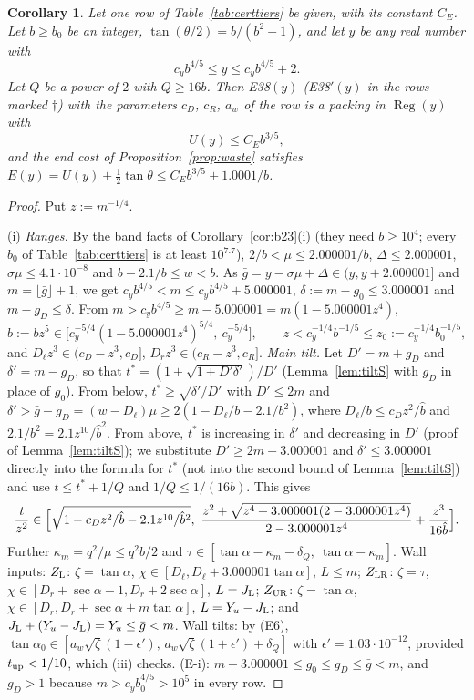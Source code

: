 \documentclass[11pt]{amsart}
\newcommand{\Reg}{\operatorname{Reg}}
\newcommand{\ta}{\tan\alpha}
\newcommand{\se}{\sec\alpha}
\newcommand{\taz}{\tan\alpha_0}
\newtheorem{corollary}[theorem]{Corollary}
\theoremstyle{definition}
\theoremstyle{remark}
\numberwithin{equation}{section}
\begin{document}
\begin{corollary}\label{cor:b35}
Let one row of Table~\ref{tab:certtiers} be given, with its constant $C_E$. Let $b\ge b_0$ be an integer,
$\tan(\theta/2)=b/(b^2-1)$, and let $y$ be any real number with
\[
c_yb^{4/5}\le y\le c_yb^{4/5}+2 .
\]
Let $Q$ be a power of $2$ with $Q\ge16b$. Then E38$(y)$
(E38$'(y)$ in the rows marked $\dagger$)
with the parameters $c_D$, $c_R$, $a_w$ of the row is a packing in $\Reg(y)$ with
\[
U(y)\le C_Eb^{3/5},
\]
and the end cost of Proposition~\ref{prop:waste} satisfies $E(y)=U(y)+\frac12\tan\theta\le C_Eb^{3/5}+1.0001/b$.
\end{corollary}

\begin{proof}
Put $z:=m^{-1/4}$.

(i) \emph{Ranges.} By the band facts of Corollary~\ref{cor:b23}(i) (they need $b\ge10^4$; every $b_0$ of
Table~\ref{tab:certtiers} is at least $10^{7.7}$), $2/b<\mu\le2.000001/b$, $\Delta\le2.000001$,
$\sigma\mu\le4.1\cdot10^{-8}$ and $b-2.1/b\le w<b$. As $\bar g=y-\sigma\mu+\Delta\in(y,y+2.000001]$ and
$m=\lfloor\bar g\rfloor+1$, we get $c_yb^{4/5}<m\le c_yb^{4/5}+5.000001$, $\delta:=m-g_0\le3.000001$ and
$m-g_D\le\delta$. From $m>c_yb^{4/5}\ge m-5.000001=m(1-5.000001z^4)$,
\[
\hat b:=bz^5\in\bigl[c_y^{-5/4}(1-5.000001z^4)^{5/4},\ c_y^{-5/4}\bigr],\qquad
z<c_y^{-1/4}b^{-1/5}\le z_0:=c_y^{-1/4}b_0^{-1/5},
\]
and $D_\ell z^3\in(c_D-z^3,c_D]$, $D_rz^3\in(c_R-z^3,c_R]$. \emph{Main tilt.} Let $D'=m+g_D$ and $\delta'=m-g_D$, so that
$t^*=(1+\sqrt{1+D'\delta'})/D'$ (Lemma~\ref{lem:tiltS} with $g_D$ in place of $g_0$). From below,
$t^*\ge\sqrt{\delta'/D'}$ with $D'\le2m$ and $\delta'>\bar g-g_D=(w-D_\ell)\mu\ge2(1-D_\ell/b-2.1/b^2)$, where
$D_\ell/b\le c_Dz^2/\hat b$ and $2.1/b^2=2.1z^{10}/\hat b^2$. From above, $t^*$ is increasing in $\delta'$ and decreasing
in $D'$ (proof of Lemma~\ref{lem:tiltS}); we substitute $D'\ge2m-3.000001$ and $\delta'\le3.000001$ directly into the
formula for $t^*$ (not into the second bound of Lemma~\ref{lem:tiltS}) and use $t\le t^*+1/Q$ and $1/Q\le1/(16b)$. This
gives
\[
\frac t{z^2}\in\Bigl[\sqrt{1-c_Dz^2/\hat b-2.1z^{10}/\hat b^2},\ \frac{z^2+\sqrt{z^4+3.000001(2-3.000001z^4)}}{2-3.000001z^4}
+\frac{z^3}{16\hat b}\Bigr].
\]
Further $\kappa_m=q^2/\mu\le q^2b/2$ and $\tau\in[\ta-\kappa_m-\delta_Q,\ \ta-\kappa_m]$. Wall inputs: $Z_{\rm L}$:
$\zeta=\ta$, $\chi\in[D_\ell,D_\ell+3.000001\ta]$, $L\le m$; $Z_{\rm LR}$: $\zeta=\tau$, $\chi\in[D_r+\se-1,D_r+2\se]$,
$L=J_{\rm L}$; $Z_{\rm UR}$: $\zeta=\ta$, $\chi\in[D_r,D_r+\se+m\ta]$, $L=Y_u-J_{\rm L}$; and
$J_{\rm L}+(Y_u-J_{\rm L})=Y_u\le\bar g<m$. Wall tilts: by (E6),
$\taz\in[a_w\sqrt\zeta(1-\epsilon'),\,a_w\sqrt\zeta(1+\epsilon')+\delta_Q]$ with $\epsilon'=1.03\cdot10^{-12}$, provided
$t_{\rm up}<1/10$, which (iii) checks. (E-i): $m-3.000001\le g_0\le g_D\le\bar g<m$, and $g_D>1$ because
$m>c_yb_0^{4/5}>10^5$ in every row.


\end{proof}
\end{document}
